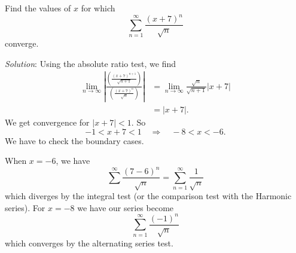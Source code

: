\begin{example}
Find the values of $x$ for which
\begin{equation}
\sum^{\infty}_{n=1}\frac{(x+7)^{n}}{\sqrt{n}}
\end{equation}
converge.

\emph{Solution}: Using the absolute ratio test, we find
\begin{equation}
\begin{aligned}
\lim_{n\to\infty}\left|\frac{\left(\displaystyle\frac{(x+7)^{n+1}}{\sqrt{n+1}}\right)}{\left(\displaystyle\frac{(x+7)^{n}}{\sqrt{n}}\right)}\right|
&=\lim_{n\to\infty}\frac{\sqrt{n}}{\sqrt{n+1}}|x+7|\\
&=|x+7|.
\end{aligned}
\end{equation}
We get convergence for $|x+7|<1$. So
\begin{equation}
-1<x+7<1\quad\Longrightarrow\quad-8<x<-6.
\end{equation}
We have to check the boundary cases.

When $x=-6$, we have
\begin{equation}
\sum^{\infty}\frac{(7-6)^{n}}{\sqrt{n}}=\sum^{\infty}_{n=1}\frac{1}{\sqrt{n}}
\end{equation}
which diverges by the integral test (or the comparison test with
the Harmonic series). For $x=-8$ we have our series become
\begin{equation}
\sum^{\infty}_{n=1}\frac{(-1)^{n}}{\sqrt{n}}
\end{equation}
which converges by the alternating series test.
\end{example}


%
